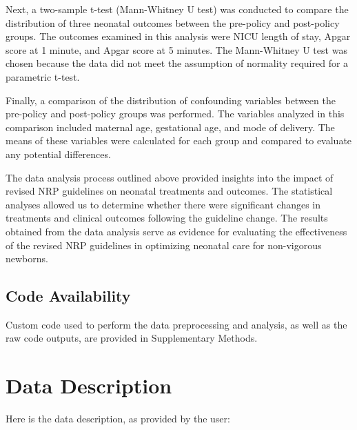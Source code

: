 \documentclass[11pt]{article}
\begin{document}
Next, a two-sample t-test (Mann-Whitney U test) was conducted to compare the distribution of three neonatal outcomes between the pre-policy and post-policy groups. The outcomes examined in this analysis were NICU length of stay, Apgar score at 1 minute, and Apgar score at 5 minutes. The Mann-Whitney U test was chosen because the data did not meet the assumption of normality required for a parametric t-test.

Finally, a comparison of the distribution of confounding variables between the pre-policy and post-policy groups was performed. The variables analyzed in this comparison included maternal age, gestational age, and mode of delivery. The means of these variables were calculated for each group and compared to evaluate any potential differences.

The data analysis process outlined above provided insights into the impact of revised NRP guidelines on neonatal treatments and outcomes. The statistical analyses allowed us to determine whether there were significant changes in treatments and clinical outcomes following the guideline change. The results obtained from the data analysis serve as evidence for evaluating the effectiveness of the revised NRP guidelines in optimizing neonatal care for non-vigorous newborns.\subsection*{Code Availability}

Custom code used to perform the data preprocessing and analysis, as well as the raw code outputs, are provided in Supplementary Methods.


\clearpage
\appendix

\section{Data Description} \label{sec:data_description} Here is the data description, as provided by the user:
\end{document}
